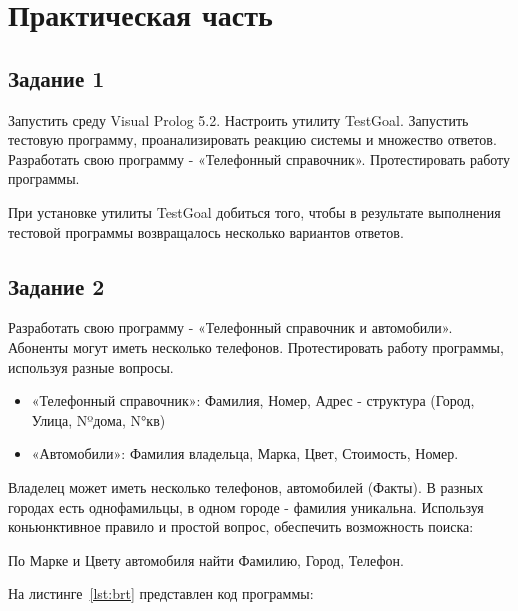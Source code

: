 \chapter*{Практическая часть}

\section*{Задание 1}
Запустить среду Visual Prolog 5.2. Настроить утилиту TestGoal.
Запустить тестовую программу, проанализировать реакцию системы и множество ответов.
Разработать свою программу - «Телефонный справочник».
Протестировать работу программы.

При установке утилиты TestGoal добиться того, чтобы в результате выполнения
тестовой программы возвращалось несколько вариантов ответов.

\section*{Задание 2}
Разработать свою программу - «Телефонный справочник и автомобили». Абоненты
могут иметь несколько телефонов. Протестировать работу программы, используя разные вопросы.

\begin{itemize}
    \item «Телефонный справочник»: Фамилия, Номер, Адрес - структура (Город, Улица, Nºдома, N°кв)
    \item «Автомобили»: Фамилия владельца, Марка, Цвет, Стоимость, Номер.
\end{itemize}

Владелец может иметь несколько телефонов, автомобилей (Факты). В разных городах есть однофамильцы, в одном городе - фамилия уникальна.
Используя коньюнктивное правило и простой вопрос, обеспечить возможность
поиска:

По Марке и Цвету автомобиля найти Фамилию, Город, Телефон.

На листинге~\ref{lst:brt} представлен код программы:

